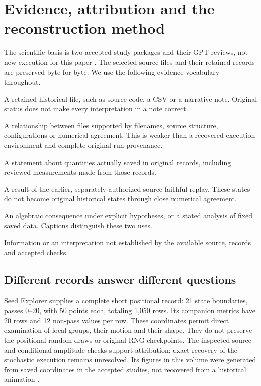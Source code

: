 \documentclass[11pt,a4paper]{article}
\newcommand{\ev}[1]{\textsf{\small #1}}
\begin{document}
\section{Evidence, attribution and the reconstruction method}
\label{sec:evidence}
The scientific basis is two accepted study packages and their GPT reviews, not new execution for this paper \cite{study4,review4,study5,review5}. The selected source files and their retained records are preserved byte-for-byte. We use the following evidence vocabulary throughout.

\begin{description}[style=nextline,leftmargin=0pt,labelwidth=0pt,labelindent=0pt]
\item[\ev{ORIGINAL}] A retained historical file, such as source code, a CSV or a narrative note. Original status does not make every interpretation in a note correct.
\item[\ev{ATTRIBUTED}] A relationship between files supported by filenames, source structure, configurations or numerical agreement. This is weaker than a recovered execution environment and complete original run provenance.
\item[\ev{OBSERVED IN HISTORICAL DATA}] A statement about quantities actually saved in original records, including reviewed measurements made from those records.
\item[\ev{REPRODUCED}] A result of the earlier, separately authorized source-faithful replay. These states do not become original historical states through close numerical agreement.
\item[\ev{DERIVED}] An algebraic consequence under explicit hypotheses, or a stated analysis of fixed saved data. Captions distinguish these two uses.
\item[\ev{UNRESOLVED}] Information or an interpretation not established by the available source, records and accepted checks.
\end{description}

\subsection{Different records answer different questions}
Seed Explorer supplies a complete short positional record: 21 state boundaries, passes 0--20, with 50 points each, totaling 1,050 rows. Its companion metrics have 20 rows and 12 non-pass values per row. These coordinates permit direct examination of local groups, their motion and their shape. They do not preserve the positional random draws or original RNG checkpoints. The inspected source and conditional amplitude checks support attribution; exact recovery of the stochastic execution remains unresolved. Its figures in this volume were generated from saved coordinates in the accepted studies, not recovered from a historical animation \cite{evidence4}.
\end{document}
